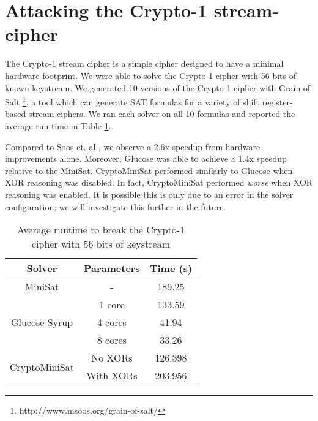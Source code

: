 \section{Attacking the Crypto-1 stream-cipher}
The Crypto-1 stream cipher is a simple cipher designed to have a minimal hardware footprint. We were able to solve the Crypto-1 cipher with 56 bits of known keystream. We generated 10 versions of the Crypto-1 cipher with Grain of Salt \footnote{http://www.msoos.org/grain-of-salt/}, a tool which can generate SAT formulas for a variety of shift register-based stream ciphers. We ran each solver on all 10 formulas and reported the average run time in Table \ref{table:crypto1:runtime}.

Compared to Soos et. al \cite{SNC09}, we observe a 2.6x speedup from hardware improvements alone. Moreover, Glucose was able to achieve a 1.4x speedup relative to the MiniSat. CryptoMiniSat performed similarly to Glucose when XOR reasoning was disabled. In fact, CryptoMiniSat performed \textit{worse} when XOR reasoning was enabled. It is possible this is only due to an error in the solver configuration; we will investigate this further in the future.

\begin{table}[!htbp]
	\centering
	\begin{tabular}{|c|c|c|}
		\hline
		\textbf{Solver} & \textbf{Parameters} & \textbf{Time (s)} \\
		\hline
		MiniSat & - & 189.25 \\
		\hline
		\multirow{3}{*}{Glucose-Syrup} & 1 core & 133.59 \\ \cline{2-3}
		& 4 cores & 41.94 \\ \cline{2-3}
		& 8 cores & 33.26 \\
		\hline
		
		\multirow{2}{*}{CryptoMiniSat} & No {XORs} & 126.398 \\ \cline{2-3}
		& With {XORs} & 203.956 \\ \cline{2-3}
		\hline
	\end{tabular}
	
	\caption{Average runtime to break the Crypto-1 cipher with 56 bits of keystream}
	\label{table:crypto1:runtime}
\end{table}
